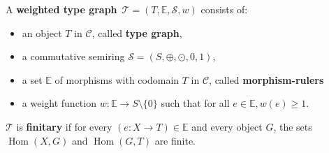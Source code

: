 \begin{definition}
    \label{wf:def:weighted_type_graph}
    A \textbf{weighted type graph}~\(\mathcal{T} = (T, \mathbb{E}, \mathcal{S}, w)\) consists of:
    \begin{itemize} 
        \item an object \(T\) in $\mathcal{C}$, called \textbf{type graph},
        \item a commutative semiring \(\mathcal{S}=(S, \oplus, \odot, 0, 1)\),
        \item a set \(\mathbb{E}\) of morphisms with codomain $T$ in $\mathcal{C}$, called \textbf{morphism-rulers}
        \item a weight function \(w : \mathbb{E} \to S \setminus \{0\}\) such that for all $e \in \mathbb{E}, w(e) \geq 1$.
    \end{itemize}
    \(\mathcal{T}\) is \textbf{finitary} if for every \( (e :X \to T) \in \mathbb{E}\) and every object \(G\), the sets \(\operatorname{Hom}(X, G)\) and \(\operatorname{Hom}(G, T)\) are finite.
\end{definition}

